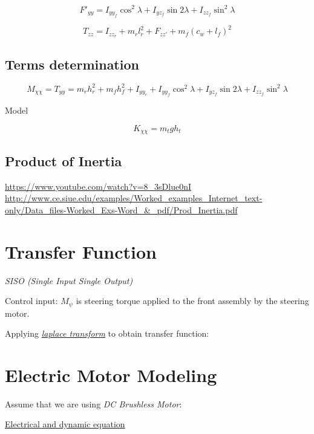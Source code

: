 \documentclass[11pt]{article}
\begin{document}
\begin{equation}
    F'_{yy} = I_{yy_f}\cos^2\lambda + I_{yz_f}\sin2\lambda + I_{zz_f}\sin^2\lambda
\end{equation}

\begin{equation}
    T_{zz} = I_{zz_{r}} + m_r l^2_{r} + F_{zz'} + m_f(c_w + l_f)^2
\end{equation}

\subsection{Terms determination}
\begin{equation}
    M_{\chi\chi} = T_{yy} =  m_r h^2_r + m_fh^2_f + I_{yy_r} + I_{yy_f}\cos^2\lambda + I_{yz_f}\sin2\lambda + I_{zz_f}\sin^2\lambda
\end{equation}

Model

\begin{equation}
    K_{\chi\chi} = m_{t}gh_{t}
\end{equation}

\subsection{Product of Inertia}
\url{https://www.youtube.com/watch?v=8_3sDlue0nI}
\url{http://www.ce.siue.edu/examples/Worked_examples_Internet_text-only/Data_files-Worked_Exs-Word_&_pdf/Prod_Inertia.pdf}

\section{Transfer Function}

{\em SISO (Single Input Single Output)}

Control input:
$M_{\psi}$ is steering torque applied to the front assembly by the steering motor.

Applying {\em \href{http://tutorial.math.lamar.edu/pdf/Laplace_Table.pdf}{laplace transform}} to obtain transfer function:

\section{Electric Motor Modeling}

Assume that we are using {\em DC Brushless Motor}:

\href{http://ctms.engin.umich.edu/CTMS/index.php?example=MotorSpeed&section=SystemModeling#3}{Electrical and dynamic equation}
\end{document}
